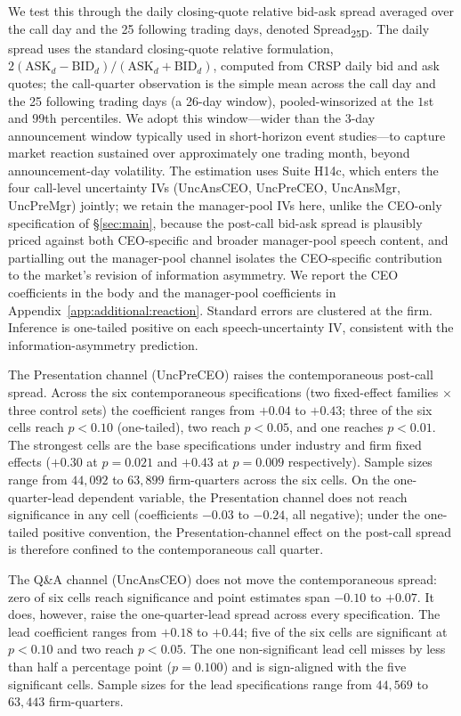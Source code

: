 We test this through the daily closing-quote relative bid-ask spread averaged over the call day and the 25 following trading days, denoted Spread\textsubscript{25D}. The daily spread uses the standard closing-quote relative formulation, $2(\text{ASK}_d - \text{BID}_d)/(\text{ASK}_d + \text{BID}_d)$, computed from CRSP daily bid and ask quotes; the call-quarter observation is the simple mean across the call day and the 25 following trading days (a 26-day window), pooled-winsorized at the $1$st and $99$th percentiles. We adopt this window---wider than the 3-day announcement window typically used in short-horizon event studies---to capture market reaction sustained over approximately one trading month, beyond announcement-day volatility. The estimation uses Suite H14c, which enters the four call-level uncertainty IVs (UncAnsCEO, UncPreCEO, UncAnsMgr, UncPreMgr) jointly; we retain the manager-pool IVs here, unlike the CEO-only specification of \S\ref{sec:main}, because the post-call bid-ask spread is plausibly priced against both CEO-specific and broader manager-pool speech content, and partialling out the manager-pool channel isolates the CEO-specific contribution to the market's revision of information asymmetry. We report the CEO coefficients in the body and the manager-pool coefficients in Appendix~\ref{app:additional:reaction}. Standard errors are clustered at the firm. Inference is one-tailed positive on each speech-uncertainty IV, consistent with the information-asymmetry prediction.

The Presentation channel (UncPreCEO) raises the contemporaneous post-call spread. Across the six contemporaneous specifications (two fixed-effect families $\times$ three control sets) the coefficient ranges from $+0.04$ to $+0.43$; three of the six cells reach $p<0.10$ (one-tailed), two reach $p<0.05$, and one reaches $p<0.01$. The strongest cells are the base specifications under industry and firm fixed effects ($+0.30$ at $p=0.021$ and $+0.43$ at $p=0.009$ respectively). Sample sizes range from $44{,}092$ to $63{,}899$ firm-quarters across the six cells. On the one-quarter-lead dependent variable, the Presentation channel does not reach significance in any cell (coefficients $-0.03$ to $-0.24$, all negative); under the one-tailed positive convention, the Presentation-channel effect on the post-call spread is therefore confined to the contemporaneous call quarter.

The Q\&A channel (UncAnsCEO) does not move the contemporaneous spread: zero of six cells reach significance and point estimates span $-0.10$ to $+0.07$. It does, however, raise the one-quarter-lead spread across every specification. The lead coefficient ranges from $+0.18$ to $+0.44$; five of the six cells are significant at $p<0.10$ and two reach $p<0.05$. The one non-significant lead cell misses by less than half a percentage point ($p=0.100$) and is sign-aligned with the five significant cells. Sample sizes for the lead specifications range from $44{,}569$ to $63{,}443$ firm-quarters.

